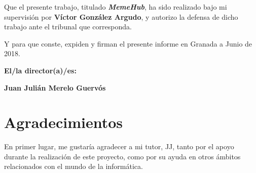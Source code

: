 \vspace{0.5cm}

Que el presente trabajo, titulado \textit{\textbf{MemeHub}},
ha sido realizado bajo mi supervisión por \textbf{Víctor González Argudo}, y autorizo la defensa de dicho trabajo ante el tribunal
que corresponda.

\vspace{0.5cm}

Y para que conste, expiden y firman el presente informe en Granada a Junio de 2018.

\vspace{1cm}

\textbf{El/la director(a)/es: }

\vspace{5cm}

\noindent \textbf{Juan Julián Merelo Guervós}

\chapter*{Agradecimientos}

En primer lugar, me gustaría agradecer a mi tutor, JJ, tanto por el apoyo durante la realización
de este proyecto, como por su ayuda en otros ámbitos relacionados con el mundo de la informática.
\\\\


